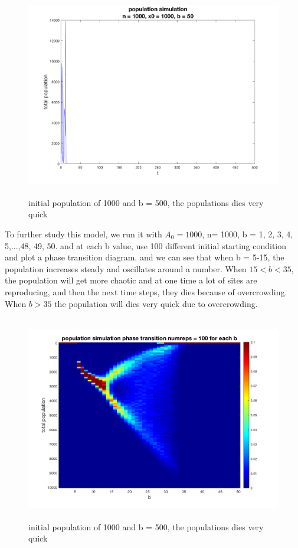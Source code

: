 \documentclass[12pt]{article}
\begin{document}
\begin{figure}[H] %
\centering
\includegraphics[width = 12 cm, height = 9cm]{single_run n1000 x01000 b50.png}
\caption{initial population of 1000 and b = 500, the populations dies very quick}
\label{fig:p1s8}
\end{figure}


To further study this model, we run it with $A_{0} = 1000$, n= 1000, b = 1, 2, 3, 4, 5,...,48, 49, 50. and at each b value, use 100 different initial starting condition and plot a phase transition diagram. and we can see that when b = 5-15, the population increases steady and oscillates around a number. When $15<b<35$, the population will get more chaotic and at one time a lot of sites are reproducing, and then the next time steps, they dies because of overcrowding. When $b>35$ the population will dies very quick due to overcrowding. 


\begin{figure}[H] %
\centering
\includegraphics[width = 12 cm, height = 9cm]{q1_phase_r100.png}
\caption{initial population of 1000 and b = 500, the populations dies very quick}
\label{fig:p1q1pd}
\end{figure}
\end{document}
